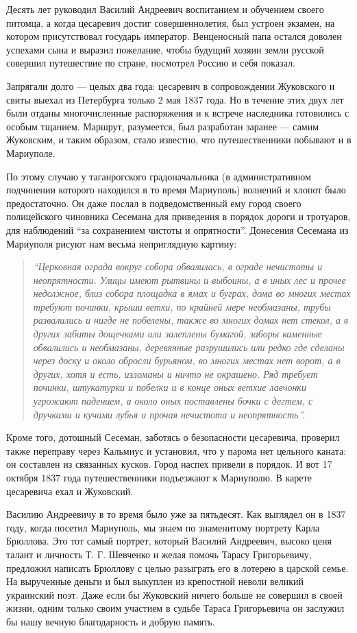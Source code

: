 Десять лет руководил Василий Андреевич воспитанием и обучением своего питомца,
а когда цесаревич достиг совершеннолетия, был устроен экзамен, на котором
присутствовал государь император. Венценосный папа остался доволен успехами
сына и выразил пожелание, чтобы будущий хозяин земли русской совершил
путешествие по стране, посмотрел Россию и себя показал.

Запрягали долго — целых два года: цесаревич в сопровождении Жуковского и свиты
выехал из Петербурга только 2 мая 1837 года. Но в течение этих двух лет были
отданы многочисленные распоряжения и к встрече наследника готовились с особым
тщанием. Маршрут, разумеется, был разработан заранее — самим Жуковским, и
таким образом, стало известно, что путешественники побывают и в Мариуполе.

По этому случаю у таганрогского градоначальника (в административном подчинении
которого находился в то время Мариуполь) волнений и хлопот было предостаточно.
Он даже послал в подведомственный ему город своего полицейского чиновника
Сесемана для при­ведения в порядок дороги и тротуаров, для наблюдений \enquote{за
сохранением чистоты и опрятности}. Донесения Сесемана из Мариуполя рисуют нам
весьма неприглядную картину:

\begin{quote}
\em\enquote{Церковная ограда вокруг собора обвалилась, в ограде нечистоты и неопрятности.
Ули­цы имеют рытвины и выбоины, а в иных лес и прочее недолжное, близ собора
площадка в ямах и буграх, дома во многих местах требуют починки, крыши ветхи,
по крайней мере необмазаны, трубы развалились и нигде не побелены, также во
многих домах нет стекол, а в других забиты дощечками или залеплены бумагой,
заборы каменные обвалились и необмазаны, деревянные разрушились или редко где
сделаны через доску и около обросли бурьяном, во многих местах нет ворот, а в
других, хотя и есть, изломаны и ничто не окрашено. Ряд требует починки,
штукатурки и побелки и в конце оных ветхие лавчонки угрожают падением, а около
оных поставлены бочки с дегтем, с дручками и кучами лубья и прочая нечистота и
неопрятность}.
\end{quote}

Кроме того, дотошный Сесеман, заботясь о безопасности цесаревича, проверил
также переправу через Кальмиус и установил, что у парома нет цельного каната:
он составлен из связанных кусков. Город наспех привели в порядок. И вот 17
октября 1837 года путешественники подъезжают к Мариуполю. В карете цесаревича
ехал и Жуковский.

Василию Андреевичу в то время было уже за пятьдесят. Как выглядел он в 1837
году, когда посетил Мариуполь, мы знаем по знаменитому портрету Карла Брюллова.
Это тот самый портрет, который Василий Андреевич, высоко ценя талант и личность
Т. Г. Шевченко и желая помочь Тарасу Григорьевичу, предложил написать Брюллову
с целью разыграть его в лотерею в царской семье. На вырученные деньги и был
выкуплен из крепостной неволи великий украинский поэт. Даже если бы Жуковский
ничего больше не совершил в своей жизни, одним только своим участием в судьбе
Тараса Григорьевича он заслужил бы нашу вечную благодарность и добрую память.


